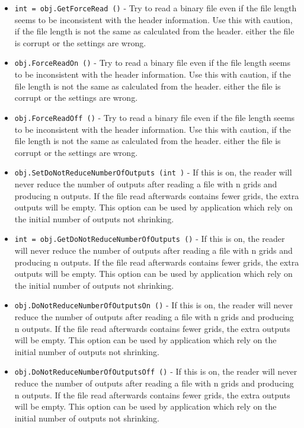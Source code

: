 \begin{itemize}
\item  \verb|int = obj.GetForceRead ()| -  Try to read a binary file even if the file length seems to be
 inconsistent with the header information. Use this with caution,
 if the file length is not the same as calculated from the header.
 either the file is corrupt or the settings are wrong. 

\item  \verb|obj.ForceReadOn ()| -  Try to read a binary file even if the file length seems to be
 inconsistent with the header information. Use this with caution,
 if the file length is not the same as calculated from the header.
 either the file is corrupt or the settings are wrong. 

\item  \verb|obj.ForceReadOff ()| -  Try to read a binary file even if the file length seems to be
 inconsistent with the header information. Use this with caution,
 if the file length is not the same as calculated from the header.
 either the file is corrupt or the settings are wrong. 

\item  \verb|obj.SetDoNotReduceNumberOfOutputs (int )| -  If this is on, the reader will never reduce the number of outputs  
 after reading a file with n grids and producing n outputs. If the
 file read afterwards contains fewer grids, the extra outputs will
 be empty. This option can be used by application which rely on
 the initial number of outputs not shrinking.

\item  \verb|int = obj.GetDoNotReduceNumberOfOutputs ()| -  If this is on, the reader will never reduce the number of outputs  
 after reading a file with n grids and producing n outputs. If the
 file read afterwards contains fewer grids, the extra outputs will
 be empty. This option can be used by application which rely on
 the initial number of outputs not shrinking.

\item  \verb|obj.DoNotReduceNumberOfOutputsOn ()| -  If this is on, the reader will never reduce the number of outputs  
 after reading a file with n grids and producing n outputs. If the
 file read afterwards contains fewer grids, the extra outputs will
 be empty. This option can be used by application which rely on
 the initial number of outputs not shrinking.

\item  \verb|obj.DoNotReduceNumberOfOutputsOff ()| -  If this is on, the reader will never reduce the number of outputs  
 after reading a file with n grids and producing n outputs. If the
 file read afterwards contains fewer grids, the extra outputs will
 be empty. This option can be used by application which rely on
 the initial number of outputs not shrinking.


\end{itemize}
